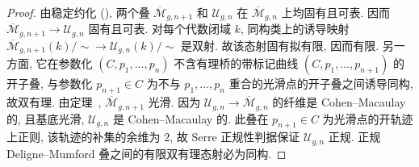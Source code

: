 \begin{proof}
由稳定约化 (), 两个叠 $\overline{\mathcal M}_{g,\allowbreak n+1}$ 和 $\mathcal U_{g,\allowbreak n}$ 在 $\overline{\mathcal M}_{g,\allowbreak n}$ 上均固有且可表. 因而 $\overline{\mathcal M}_{g,\allowbreak n+1}\to\mathcal U_{g,\allowbreak n}$ 固有且可表. 对每个代数闭域 $k$, 同构类上的诱导映射 $\overline{\mathcal M}_{g,\allowbreak n+1}(k)/{\sim}\to\mathcal U_{g,\allowbreak n}(k)/{\sim}$ 是双射. 故该态射固有拟有限, 因而有限. 另一方面, 它在参数化 $(C,\allowbreak p_1,\allowbreak \ldots,\allowbreak p_n)$ 不含有理桥的带标记曲线 $(C,\allowbreak p_1,\allowbreak \ldots,\allowbreak p_{n+1})$ 的开子叠, 与参数化 $p_{n+1}\in C$ 为不与 $p_1,\allowbreak \ldots,\allowbreak p_n$ 重合的光滑点的开子叠之间诱导同构, 故双有理. 由定理~, $\overline{\mathcal M}_{g,\allowbreak n+1}$ 光滑. 因为 $\mathcal U_{g,\allowbreak n}\to\overline{\mathcal M}_{g,\allowbreak n}$ 的纤维是 Cohen--Macaulay 的, 且基底光滑, $\mathcal U_{g,\allowbreak n}$ 是 Cohen--Macaulay 的. 此叠在 $p_{n+1}\in C$ 为光滑点的开轨迹上正则, 该轨迹的补集的余维为 $2$, 故 Serre 正规性判据保证 $\mathcal U_{g,\allowbreak n}$ 正规. 正规 Deligne--Mumford 叠之间的有限双有理态射必为同构.
\end{proof}
